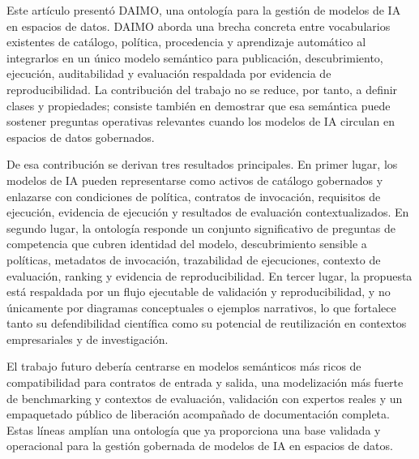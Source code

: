 \documentclass[11pt,a4paper]{article}
\begin{document}
Este artículo presentó DAIMO, una ontología para la gestión de modelos de IA en espacios de datos. DAIMO aborda una brecha concreta entre vocabularios existentes de catálogo, política, procedencia y aprendizaje automático al integrarlos en un único modelo semántico para publicación, descubrimiento, ejecución, auditabilidad y evaluación respaldada por evidencia de reproducibilidad. La contribución del trabajo no se reduce, por tanto, a definir clases y propiedades; consiste también en demostrar que esa semántica puede sostener preguntas operativas relevantes cuando los modelos de IA circulan en espacios de datos gobernados.

De esa contribución se derivan tres resultados principales. En primer lugar, los modelos de IA pueden representarse como activos de catálogo gobernados y enlazarse con condiciones de política, contratos de invocación, requisitos de ejecución, evidencia de ejecución y resultados de evaluación contextualizados. En segundo lugar, la ontología responde un conjunto significativo de preguntas de competencia que cubren identidad del modelo, descubrimiento sensible a políticas, metadatos de invocación, trazabilidad de ejecuciones, contexto de evaluación, ranking y evidencia de reproducibilidad. En tercer lugar, la propuesta está respaldada por un flujo ejecutable de validación y reproducibilidad, y no únicamente por diagramas conceptuales o ejemplos narrativos, lo que fortalece tanto su defendibilidad científica como su potencial de reutilización en contextos empresariales y de investigación.

El trabajo futuro debería centrarse en modelos semánticos más ricos de compatibilidad para contratos de entrada y salida, una modelización más fuerte de benchmarking y contextos de evaluación, validación con expertos reales y un empaquetado público de liberación acompañado de documentación completa. Estas líneas amplían una ontología que ya proporciona una base validada y operacional para la gestión gobernada de modelos de IA en espacios de datos.
\end{document}
